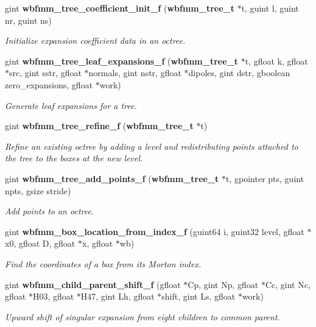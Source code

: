\begin{DoxyCompactItemize}
gint {\bf wbfmm\+\_\+tree\+\_\+coefficient\+\_\+init\+\_\+f} ({\bf wbfmm\+\_\+tree\+\_\+t} $\ast$t, guint l, guint nr, guint ns)
\begin{DoxyCompactList}\small\item\em Initialize expansion coefficient data in an octree. \end{DoxyCompactList}\item 
gint {\bf wbfmm\+\_\+tree\+\_\+leaf\+\_\+expansions\+\_\+f} ({\bf wbfmm\+\_\+tree\+\_\+t} $\ast$t, gfloat k, gfloat $\ast$src, gint sstr, gfloat $\ast$normals, gint nstr, gfloat $\ast$dipoles, gint dstr, gboolean zero\+\_\+expansions, gfloat $\ast$work)
\begin{DoxyCompactList}\small\item\em Generate leaf expansions for a tree. \end{DoxyCompactList}\item 
gint {\bf wbfmm\+\_\+tree\+\_\+refine\+\_\+f} ({\bf wbfmm\+\_\+tree\+\_\+t} $\ast$t)
\begin{DoxyCompactList}\small\item\em Refine an existing octree by adding a level and redistributing points attached to the tree to the boxes at the new level. \end{DoxyCompactList}\item 
gint {\bf wbfmm\+\_\+tree\+\_\+add\+\_\+points\+\_\+f} ({\bf wbfmm\+\_\+tree\+\_\+t} $\ast$t, gpointer pts, guint npts, gsize stride)
\begin{DoxyCompactList}\small\item\em Add points to an octree. \end{DoxyCompactList}\item 
gint {\bf wbfmm\+\_\+box\+\_\+location\+\_\+from\+\_\+index\+\_\+f} (guint64 i, guint32 level, gfloat $\ast$x0, gfloat D, gfloat $\ast$x, gfloat $\ast$wb)
\begin{DoxyCompactList}\small\item\em Find the coordinates of a box from its Morton index. \end{DoxyCompactList}\item 
gint {\bf wbfmm\+\_\+child\+\_\+parent\+\_\+shift\+\_\+f} (gfloat $\ast$Cp, gint Np, gfloat $\ast$Cc, gint Nc, gfloat $\ast$H03, gfloat $\ast$H47, gint Lh, gfloat $\ast$shift, gint Ls, gfloat $\ast$work)
\begin{DoxyCompactList}\small\item\em Upward shift of singular expansion from eight children to common parent. \end{DoxyCompactList}\item 

\end{DoxyCompactItemize}
